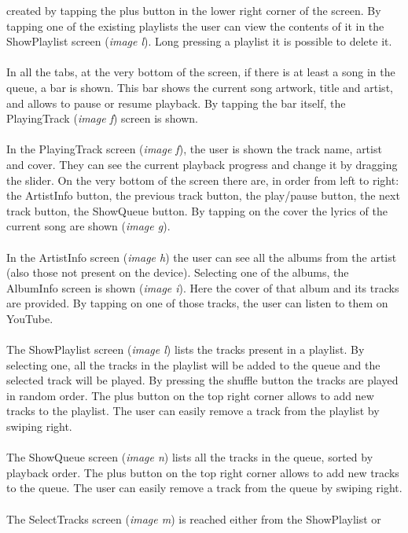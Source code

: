 \documentclass{article}
\begin{document}
created by tapping the plus button in the lower right corner of the screen. By
tapping one of the existing playlists the user can view the contents of it in
the ShowPlaylist screen (\textit{image l}). Long pressing a playlist it is possible to
delete it.
\\\\
In all the tabs, at the very bottom of the screen, if there is at least a song
in the queue, a bar is shown. This bar shows the current song artwork, title and
artist, and allows to pause or resume playback. By tapping the bar itself, the
PlayingTrack (\textit{image f}) screen is shown.
\\\\
In the PlayingTrack screen (\textit{image f}), the user is shown the track name, artist
and cover. They can see the current playback progress and change it by
dragging the slider. On the very bottom of the screen there are, in order from
left to right: the ArtistInfo button, the previous track button, the play/pause
button, the next track button, the ShowQueue button.
By tapping on the cover the lyrics of the current song are shown (\textit{image g}).
\\\\
In the ArtistInfo screen (\textit{image h}) the user can see all the albums from the
artist (also those not present on the device). Selecting one of the albums, the
AlbumInfo screen is shown (\textit{image i}). Here the cover of that album and its tracks
are provided. By tapping on one of those tracks, the user can listen to them on
YouTube.
\\\\
The ShowPlaylist screen (\textit{image l}) lists the tracks present in a playlist. By
selecting one, all the tracks in the playlist will be added to the queue and the
selected track will be played. By pressing the shuffle button the tracks are
played in random order. The plus button on the top right corner allows to add
new tracks to the playlist. The user can easily remove a track from the playlist
by swiping right.
\\\\
The ShowQueue screen (\textit{image n}) lists all the tracks in the queue, sorted by
playback order. The plus button on the top right corner allows to add new tracks
to the queue. The user can easily remove a track from the queue by swiping
right. 
\\\\
The SelectTracks screen (\textit{image m}) is reached either from the ShowPlaylist or
\end{document}
